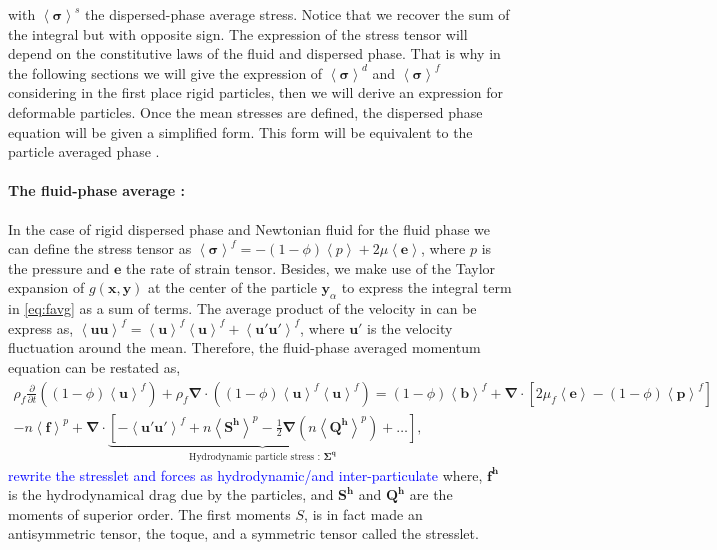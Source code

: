 with $\left<\bm{\sigma}\right>^s$ the dispersed-phase average stress. 
Notice that we recover the sum of the integral but with opposite sign.
The expression of the stress tensor will depend on the constitutive laws of the fluid and dispersed phase.  
That is why in the following sections we will give the expression of $\left<\bm{\sigma}\right>^d$ and $\left<\bm{\sigma}\right>^f$ considering in the first place rigid particles, then we will derive an expression for deformable particles. 
Once the mean stresses are defined, the dispersed phase equation will be given a simplified form.
This form will be equivalent to the particle averaged phase \citet{nott2011suspension}. 

\paragraph*{The fluid-phase average :} In the case of rigid dispersed phase and Newtonian fluid for the fluid phase we can define the stress tensor as $\left<\bm{\sigma}\right>^f = -(1-\phi)\left<p\right> + 2\mu\left<\bm{e}\right>$, where $p$ is the pressure and $\bm{e}$ the rate of strain tensor. 
Besides, we make use of the Taylor expansion of $g(\bm{x},\bm{y})$ at the center of the particle $\bm{y}_\alpha$ to express the integral term in \ref{eq:favg} as a sum of terms.  
The average product of the velocity in can be express as, $\left<\bm{uu}\right>^f = \left<\bm{u}\right>^f\left<\bm{u}\right>^f + \left<\bm{u'u'}\right>^f$, where $\bm{u'}$ is the velocity fluctuation around the mean. 
Therefore, the fluid-phase averaged momentum equation can be restated as, 
\begin{multline}
    \rho_f\frac{\partial}{\partial t} ((1-\phi)\left<\bm{u}\right>^f) + \rho_f\bm{\nabla}\cdot\left((1-\phi) \left<\bm{u}\right>^f\left<\bm{u}\right>^f\right)= (1-\phi)\left<\bm{b}\right>^f +\bm{\nabla}\cdot\left[2 \mu_f\left<\bm{e}\right> -(1-\phi) \left<\bm{p}\right>^f\right]\\-n\left<\bm{f}\right>^p+\bm{\nabla}\cdot\underbrace{\left[ - \left<\bm{u'u'}\right>^f +n\left<\bm{S^h}\right>^p -\frac{1}{2}\bm{\nabla}(n\left<\bm{Q^h}\right>^p) + \ldots\right]}_{\text{Hydrodynamic particle stress : } \bm{\Sigma^q}},
    \label{eq:favgsp}
\end{multline}
\textcolor{blue}{rewrite the stresslet and forces as hydrodynamic/and inter-particulate}
where, $\bm{f^h}$ is the hydrodynamical drag due by the particles, and $\bm{S^h}$ and $\bm{Q^h}$ are the moments of superior order.
The first moments $S$, is in fact made an antisymmetric tensor, the toque, and a symmetric tensor called the stresslet.
